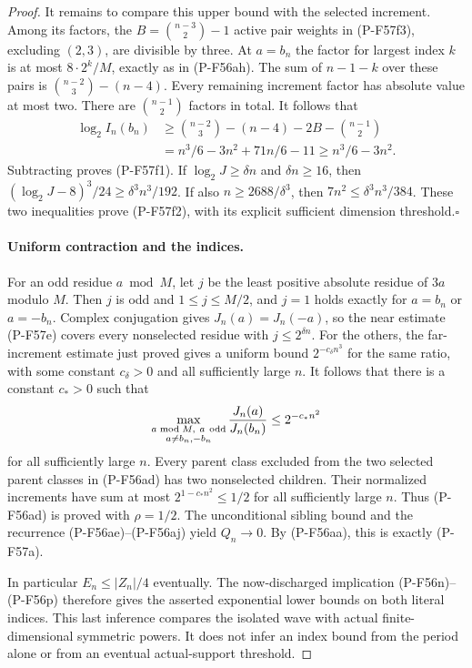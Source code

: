 \begin{proof}
It remains to compare this upper bound with the selected
increment. Among its factors, the
$B=\binom{n-3}{2}-1$ active pair weights in (P-F57f3),
excluding $(2,3)$, are divisible by three.
At $a=b_n$ the factor for largest index $k$ is at most
$8\cdot2^k/M$, exactly as in (P-F56ah).
The sum of $n-1-k$ over these pairs is
$\binom{n-2}{3}-(n-4)$.
Every remaining increment factor has absolute value at
most two. There are $\binom{n-1}{2}$ factors in total.
It follows that
\[
 \begin{split}
 \log_2 I_n(b_n)
 &\ge\binom{n-2}{3}-(n-4)-2B-\binom{n-1}{2}\\
 &=n^3/6-3n^2+71n/6-11
 \ge n^3/6-3n^2.
 \end{split}
 \tag{P-F57f9}
\]
Subtracting proves (P-F57f1).
If $\log_2J\ge\delta n$ and $\delta n\ge16$,
then $(\log_2J-8)^3/24\ge\delta^3n^3/192$.
If also $n\ge2688/\delta^3$, then
$7n^2\le\delta^3n^3/384$.
These two inequalities prove (P-F57f2), with its explicit
sufficient dimension threshold.\hfill$\square$


\paragraph{Uniform contraction and the indices.}
For an odd residue $a\bmod M$, let $j$ be the least positive
absolute residue of $3a$ modulo $M$. Then $j$ is odd and
$1\le j\le M/2$, and $j=1$ holds exactly for
$a=b_n$ or $a=-b_n$.
Complex conjugation gives $J_n(a)=J_n(-a)$, so the
near estimate (P-F57e) covers every nonselected residue
with $j\le2^{\delta n}$.
For the others, the far-increment estimate just proved gives
a uniform bound $2^{-c_\delta n^3}$ for the same ratio,
with some constant $c_\delta>0$ and all sufficiently
large $n$.
It follows that there is a constant $c_*>0$ such that
\[
 \max_{\substack{a\bmod M,\ a\ {\rm odd}\\a\ne b_n,-b_n}}
          \frac{J_n(a)}{J_n(b_n)}
                         \le2^{-c_*n^2}
 \]
for all sufficiently large $n$.
Every parent class excluded from the two selected parent
classes in (P-F56ad) has two nonselected children.
Their normalized increments have sum at most
$2^{1-c_*n^2}\le1/2$ for all sufficiently large $n$.
Thus (P-F56ad) is proved with $\rho=1/2$.
The unconditional sibling bound and the recurrence
(P-F56ae)--(P-F56aj) yield $Q_n\to0$.
By (P-F56aa), this is exactly (P-F57a).

In particular $E_n\le |Z_n|/4$ eventually.
The now-discharged implication (P-F56n)--(P-F56p)
therefore gives the asserted exponential lower bounds
on both literal indices.
This last inference compares the isolated wave with actual
finite-dimensional symmetric powers. It does not infer an
index bound from the period alone or from an eventual
actual-support threshold.
\end{proof}
